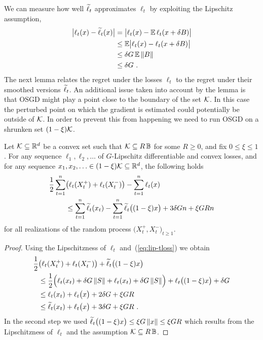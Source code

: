 We can measure how well $\widetilde{\ell}_t$ approximates $\ell_t$ by exploiting the Lipschitz assumption,
%
\begin{align}
\nonumber
    \bigl|\ell_t(x) - \widetilde{\ell}_t(x)\bigr|
&=
    \bigl|\ell_t(x) - \mathbb{E}\,\ell_t(x + \delta B)\bigr|
\\ &\le
\nonumber
    \mathbb{E}\bigl|\ell_t(x) - \ell_t(x + \delta B)\bigr|
\\ &\le
\nonumber
    \delta G\,\mathbb{E}\left\|{B}\right\|
\\ &\le
\label{eq:lip-tloss}
    \delta G~.
\end{align}
%
The next lemma relates the regret under the losses $\ell_t$ to the regret under their smoothed versions $\widetilde{\ell}_t$. An additional issue taken into account by the lemma is that OSGD might play a point close to the boundary of the set $\mathcal{K}$. In this case the perturbed point on which the gradient is estimated could potentially be outside of $\mathcal{K}$. In order to prevent this from happening we need to run OSGD on a shrunken set $(1-\xi)\mathcal{K}$.
%
\begin{lemma}
\label{l:two-point}
Let $\mathcal{K}\subseteq\mathbb{R}^d$ be a convex set such that $\mathcal{K}\subseteq R\,\mathbb{B}$ for some $R \ge 0$, and fix $0 \le \xi \le 1$.
For any sequence $\ell_1,\ell_2,\dots$ of $G$-Lipschitz differentiable and convex losses, and for any sequence $x_1,x_2,\ldots\in (1-\xi)\mathcal{K} \subseteq\mathbb{R}^d$, the following holds
\begin{align*}
    \frac{1}{2}\sum_{t=1}^n &\bigl(\ell_t(X_t^+) + \ell_t(X_t^-)\bigr) - \sum_{t=1}^n \ell_t(x)
\\& \le
    \sum_{t=1}^n \widetilde{\ell}_t(x_t) - \sum_{t=1}^n \widetilde{\ell}_t\bigl((1-\xi)x\bigr) + 3\delta G n + \xi GR n
\end{align*}
for all realizations of the random process $\bigl(X_t^+,X_t^-\bigr)_{t \ge 1}$.
\end{lemma}
%
\begin{proof}
Using the Lipschitzness of $\ell_t$ and~(\ref{eq:lip-tloss}) we obtain
\begin{align*}
    \frac{1}{2} &\bigl(\ell_t(X_t^+) + \ell_t(X_t^-)\bigr) + \widetilde{\ell}_t\bigl((1-\xi)x\bigr)
\\ &\le
    \frac{1}{2} \Bigl(\ell_t(x_t) + \delta G \left\|{S}\right\| + \ell_t(x_t) + \delta G \left\|{S}\right\| \Bigr) + \ell_t\bigl((1-\xi)x\bigr) + \delta G
\\ &\le
    \ell_t(x_t) + \ell_t\bigl(x\bigr) + 2\delta G + \xi GR
\\ &\le
    \widetilde{\ell}_t(x_t) + \ell_t\bigl(x\bigr) + 3\delta G + \xi GR~.
\end{align*}
In the second step we used $\widetilde{\ell}_t\bigl((1-\xi)x\bigr) \le \xi G\left\|{x}\right\| \le \xi GR$ which results from the Lipschitzness of $\ell_t$ and the assumption $\mathcal{K}\subseteq R\,\mathbb{B}$.
\end{proof}
